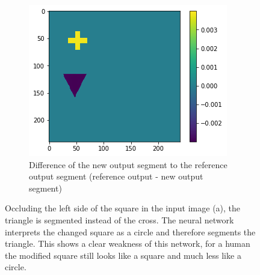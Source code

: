 \begin{figure}[H]
    \begin{subfigure}[t]{.33\textwidth}
        \centering
        \includegraphics[width=\linewidth]{chapters/06_hdm/images_analyze/2c_diff.png}
        \caption{Difference of the new output segment to the reference output segment (reference output - new output segment)}
    \end{subfigure}
    \caption{Occluding the left side of the square in the input image (a), the triangle is segmented instead of the cross. The neural network interprets the changed square as a circle and therefore segments the triangle. This shows a clear weakness of this network, for a human the modified square still looks like a square and much less like a circle.}
    \label{hdm_changed_output_4}
\end{figure}


